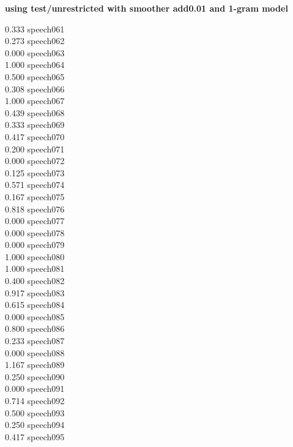 \documentclass[10pt]{article}
\begin{document}
\begin{enumerate}
\begin{enumerate}
            \textbf{using test/unrestricted with smoother add0.01 and 1-gram model}
            \begin{multicols}{5}
            0.333 speech061\\
            0.273 speech062\\
            0.000 speech063\\
            1.000 speech064\\
            0.500 speech065\\
            0.308 speech066\\
            1.000 speech067\\
            0.439 speech068\\
            0.333 speech069\\
            0.417 speech070\\
            0.200 speech071\\
            0.000 speech072\\
            0.125 speech073\\
            0.571 speech074\\
            0.167 speech075\\
            0.818 speech076\\
            0.000 speech077\\
            0.000 speech078\\
            0.000 speech079\\
            1.000 speech080\\
            1.000 speech081\\
            0.400 speech082\\
            0.917 speech083\\
            0.615 speech084\\
            0.000 speech085\\
            0.800 speech086\\
            0.233 speech087\\
            0.000 speech088\\
            1.167 speech089\\
            0.250 speech090\\
            0.000 speech091\\
            0.714 speech092\\
            0.500 speech093\\
            0.250 speech094\\
            0.417 speech095\\

\end{multicols}
\end{enumerate}
\end{enumerate}
\end{document}
